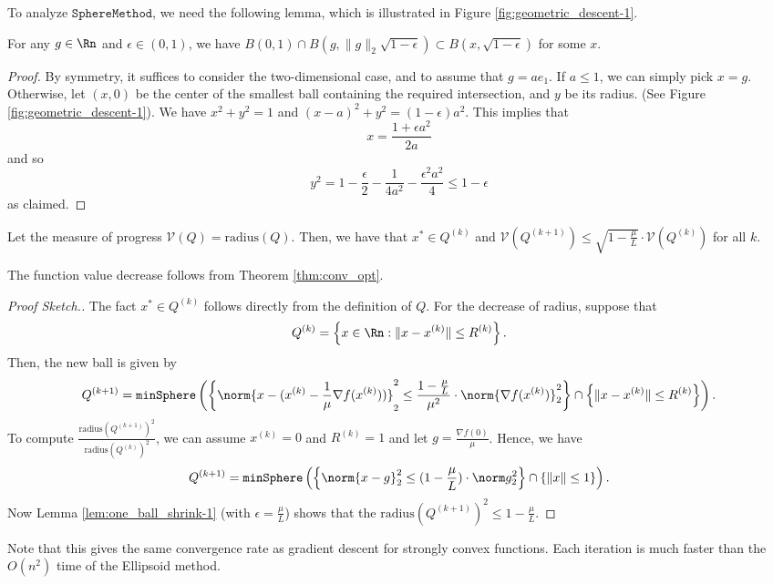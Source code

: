 To analyze $\mathtt{SphereMethod}$, we need the following lemma,
which is illustrated in Figure \ref{fig:geometric_descent-1}.
\begin{lem}
\label{lem:one_ball_shrink-1}For any $g\in\Rn$ and $\epsilon\in(0,1)$,
we have $B(0,1)\cap B(g,\|g\|_{2}\sqrt{1-\epsilon})\subset B(x,\sqrt{1-\epsilon})$
for some $x$.
\end{lem}

\begin{proof}
By symmetry, it suffices to consider the two-dimensional case, and
to assume that $g=ae_{1}$. If $a\leq1$, we can simply pick $x=g$.
Otherwise, let $(x,0)$ be the center of the smallest ball containing
the required intersection, and $y$ be its radius. (See Figure \ref{fig:geometric_descent-1}).
We have $x^{2}+y^{2}=1$ and $(x-a)^{2}+y^{2}=(1-\epsilon)a^{2}$.
This implies that 
\[
x=\frac{1+\epsilon a^{2}}{2a}
\]
and so 
\[
y^{2}=1-\frac{\epsilon}{2}-\frac{1}{4a^{2}}-\frac{\epsilon^{2}a^{2}}{4}\le1-\epsilon
\]
as claimed.
\end{proof}
\begin{lem}
Let the measure of progress $\mathcal{V}(Q)=\mathrm{radius}(Q)$.
Then, we have that $x^{*}\in Q^{(k)}$ and $\mathcal{V}(Q^{(k+1)})\leq\sqrt{1-\frac{\mu}{L}}\cdot\mathcal{V}(Q^{(k)})$
for all $k$.
\end{lem}

\begin{rem}
The function value decrease follows from Theorem \ref{thm:conv_opt}.
\end{rem}

\begin{proof}[Proof Sketch.]
The fact $x^{*}\in Q^{(k)}$ follows directly from the definition
of $Q$. For the decrease of radius, suppose that 
\[
Q^{(k)}=\left\{ x\in\Rn:\|x-x^{(k)}\|\leq R^{(k)}\right\} .
\]
Then, the new ball is given by
\[
Q^{(k+1)}=\mathtt{minSphere}\left(\left\{ \norm{x-(x^{(k)}-\frac{1}{\mu}\nabla f(x^{(k)}))}_{2}^{2}\leq\frac{1-\frac{\mu}{L}}{\mu^{2}}\cdot\norm{\nabla f(x^{(k)})}_{2}^{2}\right\} \cap\left\{ \|x-x^{(k)}\|\leq R^{(k)}\right\} \right).
\]
To compute $\frac{\mathrm{radius}(Q^{(k+1)})^{2}}{\mathrm{radius}(Q^{(k)})^{2}}$,
we can assume $x^{(k)}=0$ and $R^{(k)}=1$ and let $g=\frac{\nabla f(0)}{\mu}$.
Hence, we have
\[
Q^{(k+1)}=\mathtt{minSphere}\left(\left\{ \norm{x-g}_{2}^{2}\leq(1-\frac{\mu}{L})\cdot\norm g_{2}^{2}\right\} \cap\left\{ \|x\|\leq1\right\} \right).
\]
Now Lemma \ref{lem:one_ball_shrink-1} (with $\epsilon=\frac{\mu}{L}$)
shows that the $\mathrm{radius}(Q^{(k+1)})^{2}\leq1-\frac{\mu}{L}$.
\end{proof}
Note that this gives the same convergence rate as gradient descent
for strongly convex functions. Each iteration is much faster than
the $O(n^{2})$ time of the Ellipsoid method.

